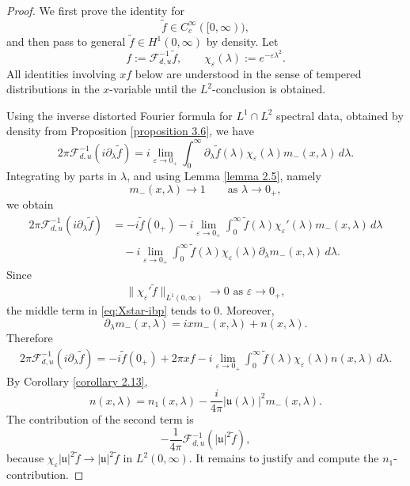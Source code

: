 \documentclass[10pt]{article}
\numberwithin{equation}{section}
\numberwithin{theorem}{section}
\begin{document}
\begin{proof}
We first prove the identity for
\[
\widetilde f\in C_c^\infty([0,\infty)),
\]
and then pass to general \(\widetilde f\in H^1(0,\infty)\) by density. Let
\[
f:=\mathcal F_{d,u}^{-1}\widetilde f,
\qquad
\chi_\varepsilon(\lambda):=e^{-\varepsilon\lambda^2}.
\]
All identities involving \(xf\) below are understood in the sense of tempered
distributions in the \(x\)-variable until the \(L^2\)-conclusion is obtained.

Using the inverse distorted Fourier formula for \(L^1\cap L^2\) spectral data, obtained
by density from Proposition \ref{proposition 3.6}, we have
\[
2\pi\mathcal F_{d,u}^{-1}(i\partial_\lambda\widetilde f)
=
i\lim_{\varepsilon\to0_{+}}
\int_0^\infty
\partial_\lambda\widetilde f(\lambda)
\chi_\varepsilon(\lambda)m_-(x,\lambda)\,d\lambda .
\]
Integrating by parts in \(\lambda\), and using Lemma \ref{lemma 2.5}, namely
\[
m_-(x,\lambda)\to1
\qquad\text{as }\lambda\to 0_+,
\]
we obtain
\begin{equation}
\label{eq:Xstar-ibp}
\begin{aligned}
2\pi\mathcal F_{d,u}^{-1}(i\partial_\lambda\widetilde f)
&=
-i\widetilde f(0_+)
-i\lim_{\varepsilon\to0_+}
\int_0^\infty
\widetilde f(\lambda)\chi_\varepsilon'(\lambda)m_-(x,\lambda)\,d\lambda  \\
&\quad
-i\lim_{\varepsilon\to0_+}
\int_0^\infty
\widetilde f(\lambda)\chi_\varepsilon(\lambda)
\partial_\lambda m_-(x,\lambda)\,d\lambda .
\end{aligned}
\end{equation}
Since
\[
\|\chi_\varepsilon'\widetilde f\|_{L^1(0,\infty)}\to0 \text{ as } \varepsilon \to 0_+,
\]
the middle term in \eqref{eq:Xstar-ibp} tends to \(0\). Moreover,
\[
\partial_\lambda m_-(x,\lambda)=ixm_-(x,\lambda)+n(x,\lambda).
\]
Therefore
\begin{equation}
\label{eq:Xstar-after-n}
\begin{aligned}
2\pi\mathcal F_{d,u}^{-1}(i\partial_\lambda\widetilde f)
=-i\widetilde f(0_+)
+
2\pi xf 
-i\lim_{\varepsilon\to0_+}
\int_0^\infty
\widetilde f(\lambda)\chi_\varepsilon(\lambda)n(x,\lambda)\,d\lambda .
\end{aligned}
\end{equation}
By Corollary \ref{corollary 2.13},
\[
n(x,\lambda)
=
n_1(x,\lambda)
-
\frac{i}{4\pi}|\mathfrak u(\lambda)|^2m_-(x,\lambda).
\]
The contribution of the second term is
\[
-\frac1{4\pi}
\mathcal F_{d,u}^{-1}\left(|\mathfrak u|^2\widetilde f\right),
\]
because \(\chi_\varepsilon|\mathfrak u|^2\widetilde f\to
|\mathfrak u|^2\widetilde f\) in \(L^2(0,\infty)\). It remains to justify and compute the
\(n_1\)-contribution.


\end{proof}
\end{document}
